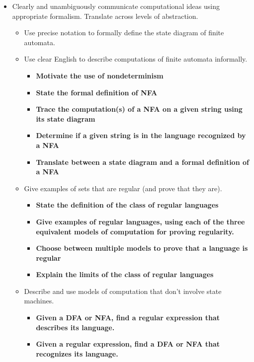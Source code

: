 \begin{itemize}
\item Clearly and unambiguously communicate computational ideas using appropriate formalism. Translate across levels of abstraction.
\begin{itemize}
   \item Use precise notation to formally define the state diagram of finite automata.
   \item Use clear English to describe computations of finite automata informally.
      \begin{itemize}
         \item {\bf Motivate the use of nondeterminism}
         \item {\bf State the formal definition of NFA}   
         \item {\bf Trace the computation(s) of a NFA on a given string using its state diagram}
         \item {\bf Determine if a given string is in the language recognized by a NFA}
         \item {\bf Translate between a state diagram and a formal definition of a NFA}
      \end{itemize}
   \item Give examples of sets that are regular (and prove that they are).
   \begin{itemize}
      \item {\bf State the definition of the class of regular languages}
      \item {\bf Give examples of regular languages, using each of the three equivalent models of computation for proving regularity.}
      \item {\bf Choose between multiple models to prove that a language is regular}
      \item {\bf Explain the limits of the class of regular languages}
   \end{itemize}
   \item Describe and use models of computation that don't involve state machines.
   \begin{itemize}
      \item {\bf Given a DFA or NFA, find a regular expression that describes its language.}
      \item {\bf Given a regular expression, find a DFA or NFA that recognizes its language.}
   \end{itemize}
\end{itemize}



\end{itemize}
